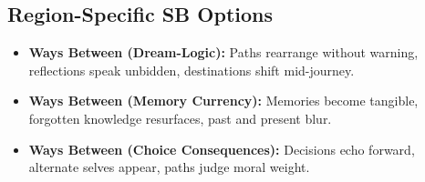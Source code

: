 \subsection*{Region-Specific SB Options}
\begin{itemize}
\item \textbf{Ways Between (Dream-Logic):} Paths rearrange without warning, reflections speak unbidden, destinations shift mid-journey.
\item \textbf{Ways Between (Memory Currency):} Memories become tangible, forgotten knowledge resurfaces, past and present blur.
\item \textbf{Ways Between (Choice Consequences):} Decisions echo forward, alternate selves appear, paths judge moral weight.
\end{itemize}
